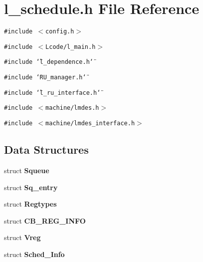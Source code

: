 \section{l\_\-schedule.h File Reference}
\label{l__schedule_8h}
{\tt \#include $<$config.h$>$}\par
{\tt \#include $<$Lcode/l\_\-main.h$>$}\par
{\tt \#include \char`\"{}l\_\-dependence.h\char`\"{}}\par
{\tt \#include \char`\"{}RU\_\-manager.h\char`\"{}}\par
{\tt \#include \char`\"{}l\_\-ru\_\-interface.h\char`\"{}}\par
{\tt \#include $<$machine/lmdes.h$>$}\par
{\tt \#include $<$machine/lmdes\_\-interface.h$>$}\par
\subsection*{Data Structures}
\begin{CompactItemize}
\item 
struct \bf{Squeue}
\item 
struct \bf{Sq\_\-entry}
\item 
struct \bf{Regtypes}
\item 
struct \bf{CB\_\-REG\_\-INFO}
\item 
struct \bf{Vreg}
\item 
struct \bf{Sched\_\-Info}
\end{CompactItemize}
